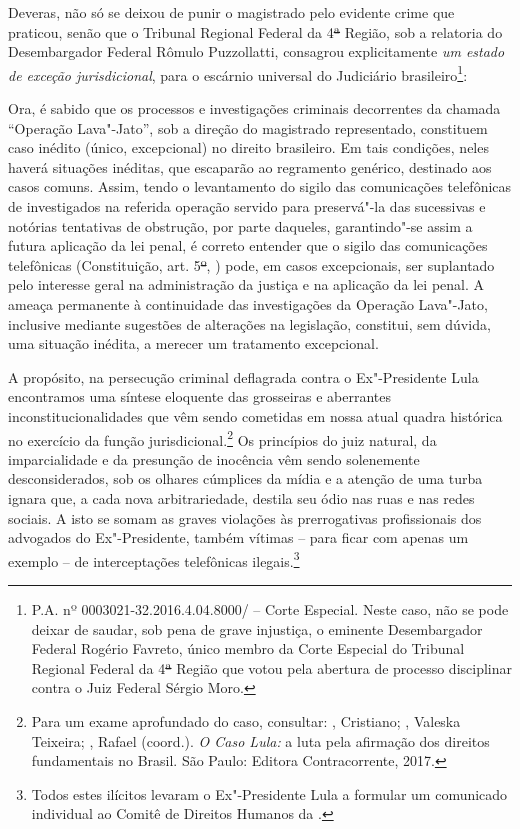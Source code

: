 Deveras, não só se deixou de punir o magistrado pelo evidente crime que
praticou, senão que o Tribunal Regional Federal da 4\sout{ª} Região, sob
a relatoria do Desembargador Federal Rômulo Puzzollatti, consagrou
explicitamente \emph{um estado de exceção jurisdicional}, para o
escárnio universal do Judiciário brasileiro\footnote{P.A. nº
  0003021-32.2016.4.04.8000/ -- Corte Especial. Neste caso, não se
  pode deixar de saudar, sob pena de grave injustiça, o eminente
  Desembargador Federal Rogério Favreto, único membro da Corte Especial
  do Tribunal Regional Federal da 4\sout{ª} Região que votou pela
  abertura de processo disciplinar contra o Juiz Federal Sérgio Moro.}:

Ora, é sabido que os processos e investigações criminais decorrentes da
chamada ``Operação Lava"-Jato'', sob a direção do magistrado
representado, constituem caso inédito (único, excepcional) no direito
brasileiro. Em tais condições, neles haverá situações inéditas, que
escaparão ao regramento genérico, destinado aos casos comuns. Assim,
tendo o levantamento do sigilo das comunicações telefônicas de
investigados na referida operação servido para preservá"-la das
sucessivas e notórias tentativas de obstrução, por parte daqueles,
garantindo"-se assim a futura aplicação da lei penal, é correto entender
que o sigilo das comunicações telefônicas (Constituição, art. 5\sout{º},
) pode, em casos excepcionais, ser suplantado pelo interesse geral na
administração da justiça e na aplicação da lei penal. A ameaça
permanente à continuidade das investigações da Operação Lava"-Jato,
inclusive mediante sugestões de alterações na legislação, constitui, sem
dúvida, uma situação inédita, a merecer um tratamento excepcional.

A propósito, na persecução criminal deflagrada contra o Ex"-Presidente
Lula encontramos uma síntese eloquente das grosseiras e aberrantes
inconstitucionalidades que vêm sendo cometidas em nossa atual quadra
histórica no exercício da função jurisdicional.\footnote{Para um exame
  aprofundado do caso, consultar:  , Cristiano; 
  , Valeska Teixeira; , Rafael (coord.). \emph{O Caso Lula:}
  a luta pela afirmação dos direitos fundamentais no Brasil. São Paulo:
  Editora Contracorrente, 2017.} Os princípios do juiz natural, da
imparcialidade e da presunção de inocência vêm sendo solenemente
desconsiderados, sob os olhares cúmplices da mídia e a atenção de uma
turba ignara que, a cada nova arbitrariedade, destila seu ódio nas ruas
e nas redes sociais. A isto se somam as graves violações às
prerrogativas profissionais dos advogados do Ex"-Presidente, também
vítimas -- para ficar com apenas um exemplo -- de interceptações
telefônicas ilegais.\footnote{Todos estes ilícitos levaram o
  Ex"-Presidente Lula a formular um comunicado individual ao Comitê de
  Direitos Humanos da .}

